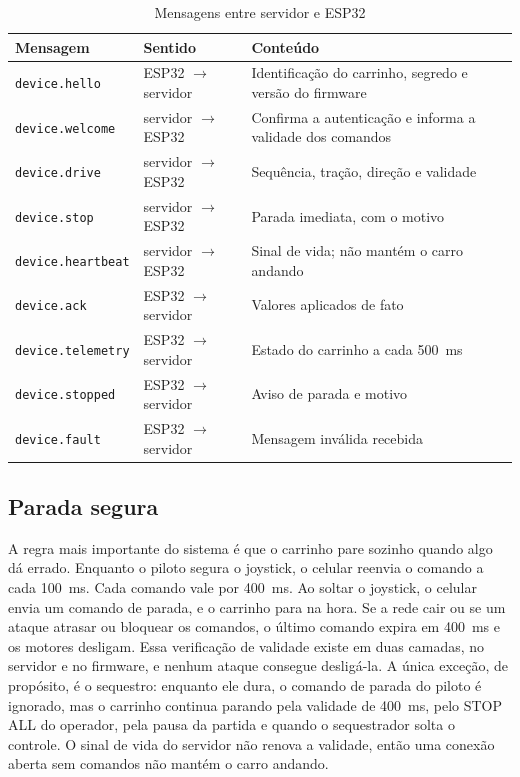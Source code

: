 \documentclass[12pt,openright,oneside,a4paper,english,brazil]{abntex2}
\begin{document}
\begin{table}[htbp]
\centering
\small
\caption{Mensagens entre servidor e ESP32}
\label{tab:mensagens}
\begin{tabularx}{\textwidth}{@{}P{3.4cm}P{3.6cm}L@{}}
\toprule
\textbf{Mensagem} & \textbf{Sentido} & \textbf{Conteúdo} \\
\midrule
\texttt{device.hello} & ESP32 $\rightarrow$ servidor & Identificação do carrinho, segredo e versão do firmware \\
\texttt{device.welcome} & servidor $\rightarrow$ ESP32 & Confirma a autenticação e informa a validade dos comandos \\
\texttt{device.drive} & servidor $\rightarrow$ ESP32 & Sequência, tração, direção e validade \\
\texttt{device.stop} & servidor $\rightarrow$ ESP32 & Parada imediata, com o motivo \\
\texttt{device.heartbeat} & servidor $\rightarrow$ ESP32 & Sinal de vida; não mantém o carro andando \\
\texttt{device.ack} & ESP32 $\rightarrow$ servidor & Valores aplicados de fato \\
\texttt{device.telemetry} & ESP32 $\rightarrow$ servidor & Estado do carrinho a cada 500~ms \\
\texttt{device.stopped} & ESP32 $\rightarrow$ servidor & Aviso de parada e motivo \\
\texttt{device.fault} & ESP32 $\rightarrow$ servidor & Mensagem inválida recebida \\
\bottomrule
\end{tabularx}
\end{table}

\subsection{Parada segura}

A regra mais importante do sistema é que o carrinho pare sozinho quando algo dá errado. Enquanto o piloto segura o joystick, o celular reenvia o comando a cada 100~ms. Cada comando vale por 400~ms. Ao soltar o joystick, o celular envia um comando de parada, e o carrinho para na hora. Se a rede cair ou se um ataque atrasar ou bloquear os comandos, o último comando expira em 400~ms e os motores desligam. Essa verificação de validade existe em duas camadas, no servidor e no firmware, e nenhum ataque consegue desligá-la. A única exceção, de propósito, é o sequestro: enquanto ele dura, o comando de parada do piloto é ignorado, mas o carrinho continua parando pela validade de 400~ms, pelo STOP ALL do operador, pela pausa da partida e quando o sequestrador solta o controle. O sinal de vida do servidor não renova a validade, então uma conexão aberta sem comandos não mantém o carro andando.
\end{document}
